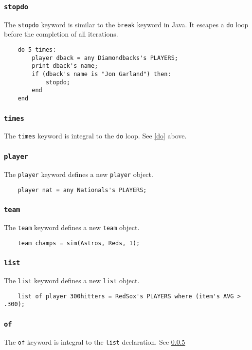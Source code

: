 \subsubsection{\texttt{stopdo}} \label{stopdo}
The \texttt{stopdo} keyword is similar to the \texttt{break} keyword in Java. It escapes a \texttt{do} loop before the completion of all iterations.
\begin{verbatim}
    do 5 times:
        player dback = any Diamondbacks's PLAYERS;
        print dback's name;
        if (dback's name is "Jon Garland") then:
            stopdo;
        end
    end
\end{verbatim}

\subsubsection{\texttt{times}}
The \texttt{times} keyword is integral to the \texttt{do} loop. See \ref{do} above.

\subsubsection{\texttt{player}}
The \texttt{player} keyword defines a new \texttt{player} object.
\begin{verbatim}
    player nat = any Nationals's PLAYERS;
\end{verbatim}

\subsubsection{\texttt{team}}
The \texttt{team} keyword defines a new \texttt{team} object.
\begin{verbatim}
    team champs = sim(Astros, Reds, 1);
\end{verbatim}

\subsubsection{\texttt{list}} \label{list}
The \texttt{list} keyword defines a new \texttt{list} object.
\begin{verbatim}
    list of player 300hitters = RedSox's PLAYERS where (item's AVG > .300);
\end{verbatim}

\subsubsection{\texttt{of}}\label{of}
The \texttt{of} keyword is integral to the \texttt{list} declaration. See \ref{list}


